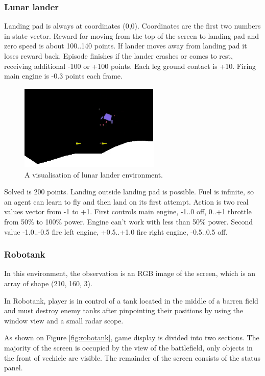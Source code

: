 \FloatBarrier
\subsubsection{Lunar lander}
Landing pad is always at coordinates (0,0). Coordinates are the first two numbers in state vector.
Reward for moving from the top of the screen to landing pad and zero speed 
is about 100..140 points.
If lander moves away from landing pad it loses reward back. Episode finishes if the lander 
crashes or comes to rest, receiving additional -100 or +100 points.
Each leg ground contact is +10. Firing main engine is -0.3 points each frame.
\begin{figure}[htb] 
	\centering
	\includegraphics[width=0.6\textwidth]{figures/lunar}
	\caption{A visualisation of lunar lander environment.}
	\label{fig:lunar}
\end{figure}
Solved is 200 points. Landing outside landing pad is possible.
Fuel is infinite, so an agent can learn to fly and then land on its first attempt. 
Action is two real values vector from -1 to +1. First controls main engine, -1..0 off, 0..+1
throttle from 50\% to 100\% power. Engine can't work with less than 50\% power. 
Second value -1.0..-0.5 fire left engine, +0.5..+1.0 fire right engine, -0.5..0.5 off.

\FloatBarrier
\subsubsection{Robotank}
In this environment, the observation is an RGB image of the screen, which is an array of shape 
(210, 160, 3).

In Robotank, player is in control of a tank located in the middle of a barren field and must 
destroy enemy tanks after pinpointing their positions by using the window view and a small 
radar scope.

As shown on Figure \ref{fig:robotank}, game display is divided into two sections. 
The majority of the screen is occupied by the view of the battlefield, only objects in 
the front of vechicle are visible. 
The remainder of the screen consists of the status panel.

